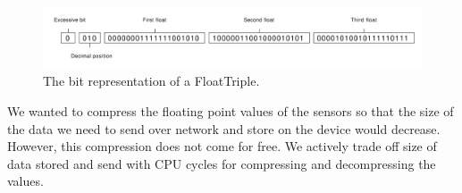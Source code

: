 \begin{figure}[!htbp]
    \centering
    \includegraphics[width=\textwidth]{graphic/data_modeling/float_triple_bit.pdf}
    \caption{The bit representation of a FloatTriple.}
    \label{fig:float_triple_bit}
\end{figure}
We wanted to compress the floating point values of the sensors so that the size of the data we need to send over network and store on the device would decrease. However, this compression does not come for free. We actively trade off size of data stored and send with CPU cycles for compressing and decompressing the values. 
